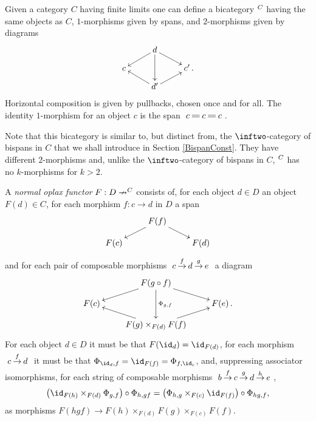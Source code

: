\documentclass[a4paper]{article}
\numberwithin{equation}{section}
\begin{document}
Given a category $C$ having finite limits one can define a bicategory $\sp C$ \cite{Benabou} having the same objects as $C$, $1$-morphisms given by spans, and $2$-morphisms given by diagrams
\begin{equation*}
 \xymatrixrowsep{.7pc} \xymatrix{ & d \ar[rd] \ar[ld] \ar[dd] & \\
 c & & c' \, .\\
 & d' \ar[ru] \ar[lu] & }
\end{equation*}
Horizontal composition is given by pullbacks, chosen once and for all. The identity $1$-morphism for an object $c$ is the span $\xymatrixcolsep{.7pc} \xymatrix{ c \ar@{=}[r] & c \ar@{=}[r] & c}$.
\begin{remark}
Note that this bicategory is similar to, but distinct from, the $\inftwo$-category of bispans in $C$ that we shall introduce in Section \ref{BispanConst}. They have different $2$-morphisms and, unlike the $\inftwo$-category of bispans in $C$, $\sp C$ has no $k$-morphisms for $k>2$.
\end{remark}
A {\em normal oplax functor} $F: D \nrightarrow \sp C$ consists of, for each object $d \in D$ an object $F(d) \in C$, for each morphism $f:c \to d$ in $D$ a span
\begin{equation*}
 \xymatrixrowsep{.8pc} \xymatrix{ & \ar[ld] F(f) \ar[rd] &  \\
 F(c) & & F(d) }
\end{equation*}
and for each pair of composable morphisms $\xymatrixcolsep{.7pc} \xymatrix{ c \ar[r]^-f & d \ar[r]^-g & e}$ a diagram
\begin{equation*}
 \xymatrixrowsep{.7pc} \xymatrix{ & F(g\circ f) \ar[rd] \ar[ld] \ar[dd]^-{\Phi_{g,f}} & \\
 F(c) & & F(e) \, .\\
 & F(g)\times_{F(d)} F(f) \ar[ru] \ar[lu] & }
\end{equation*}
For each object $d \in D$ it must be that $F(\id_d)=\id_{F(d)}$, for each morphism $\xymatrixcolsep{.7pc} \xymatrix{c \ar[r]^-f & d}$ it must be that $\Phi_{\id_d, f} = \id_{F(f)}=\Phi_{f, \id_c}$, and, suppressing associator isomorphisms, for each string of composable morphisms $\xymatrixcolsep{.7pc} \xymatrix{ b \ar[r]^-f & c \ar[r]^-g & d \ar[r]^-h & e}$,
\begin{equation}
\label{OplaxAssoc}
 \left(\id_{F(h)} \times_{F(d)} \Phi_{g,f}\right) \circ \Phi_{h,gf} = \left( \Phi_{h,g} \times_{F(c)} \id_{F(f)}\right) \circ \Phi_{hg,f},
\end{equation}
as morphisms $F(hgf) \to F(h) \times_{F(d)} F(g) \times_{F(c)} F(f)$. 
\end{document}
